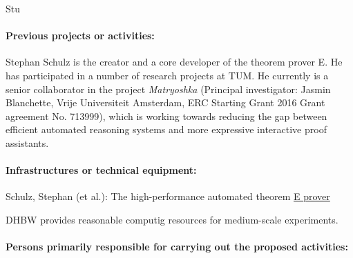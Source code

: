 \begin{sitedescription}{Stu}
\paragraph*{Previous projects or activities:}

\begin{compactitem}
\item Stephan Schulz is the creator and a core developer of the
  theorem prover E.  He has participated in a number of research
  projects at TUM. He currently is a senior collaborator in the
  project \emph{Matryoshka} (Principal investigator: Jasmin
  Blanchette, Vrije Universiteit Amsterdam, ERC Starting Grant 2016
  Grant agreement No. 713999), which is working towards reducing the
  gap between efficient automated reasoning systems and more
  expressive interactive proof assistants.
\end{compactitem}

\paragraph*{Infrastructures or technical equipment:}

\begin{compactitem}
\item Schulz, Stephan (et al.): The high-performance automated theorem
  \href{https://www.eprover.org}{E prover}
\item DHBW provides reasonable computig resources for medium-scale
  experiments.
\end{compactitem}




\paragraph*{Persons primarily responsible for carrying out the proposed activities:}


\end{sitedescription}
